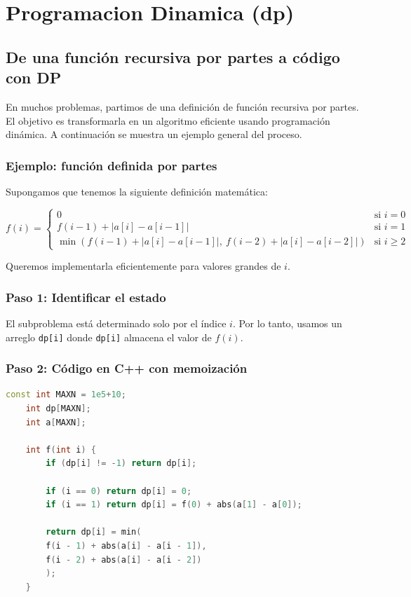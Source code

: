 \chapter{Programacion Dinamica (dp)}

\section{De una función recursiva por partes a código con DP}

En muchos problemas, partimos de una definición de función recursiva por partes. El objetivo es transformarla en un algoritmo eficiente usando programación dinámica. A continuación se muestra un ejemplo general del proceso.

\subsection*{Ejemplo: función definida por partes}

Supongamos que tenemos la siguiente definición matemática:

\[
f(i) =
\begin{cases}
	0 & \text{si } i = 0 \\
	f(i - 1) + |a[i] - a[i-1]| & \text{si } i = 1 \\
	\min(f(i - 1) + |a[i] - a[i-1]|,\ f(i - 2) + |a[i] - a[i-2]|) & \text{si } i \ge 2
\end{cases}
\]

Queremos implementarla eficientemente para valores grandes de \( i \).

\subsection*{Paso 1: Identificar el estado}

El subproblema está determinado solo por el índice \( i \). Por lo tanto, usamos un arreglo \texttt{dp[i]} donde \texttt{dp[i]} almacena el valor de \( f(i) \).

\subsection*{Paso 2: Código en C++ con memoización}

\begin{lstlisting}[language=C++, caption=Función recursiva con memoización]
	const int MAXN = 1e5+10;
	int dp[MAXN];
	int a[MAXN];
	
	int f(int i) {
		if (dp[i] != -1) return dp[i];
		
		if (i == 0) return dp[i] = 0;
		if (i == 1) return dp[i] = f(0) + abs(a[1] - a[0]);
		
		return dp[i] = min(
		f(i - 1) + abs(a[i] - a[i - 1]),
		f(i - 2) + abs(a[i] - a[i - 2])
		);
	}
\end{lstlisting}


